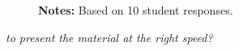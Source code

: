 \begin{boenumerate}
\begin{itemize}
\begin{figure}[h!]\centering
{}\hspace{0.5cm}
\begin{center}
\begin{minipage}[t]{0.85\columnwidth}\vspace{-0.75cm}
\item\scriptsize{\textbf{Notes:} Based on 10 student responses.}
\end{minipage}
\end{center}
\end{figure}
\FloatBarrier
\newpage
\item \textit{to present the material at the right speed?}


\end{itemize}
\end{boenumerate}
